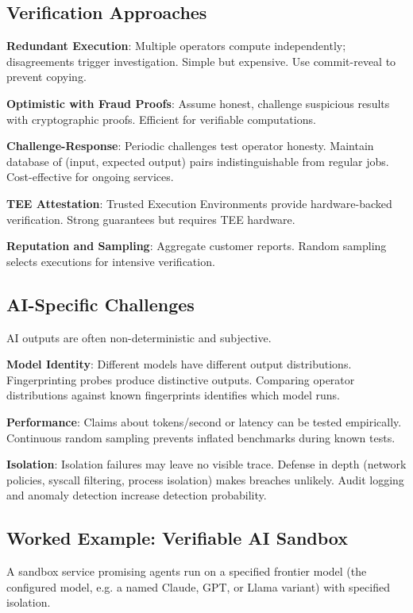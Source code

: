\documentclass[11pt,a4paper]{article}
\begin{document}
\subsection{Verification Approaches}

\textbf{Redundant Execution}: Multiple operators compute independently; disagreements trigger investigation. Simple but expensive. Use commit-reveal to prevent copying.

\textbf{Optimistic with Fraud Proofs}: Assume honest, challenge suspicious results with cryptographic proofs. Efficient for verifiable computations.

\textbf{Challenge-Response}: Periodic challenges test operator honesty. Maintain database of (input, expected output) pairs indistinguishable from regular jobs. Cost-effective for ongoing services.

\textbf{TEE Attestation}: Trusted Execution Environments provide hardware-backed verification. Strong guarantees but requires TEE hardware.

\textbf{Reputation and Sampling}: Aggregate customer reports. Random sampling selects executions for intensive verification.

\subsection{AI-Specific Challenges}

AI outputs are often non-deterministic and subjective.

\textbf{Model Identity}: Different models have different output distributions. Fingerprinting probes produce distinctive outputs. Comparing operator distributions against known fingerprints identifies which model runs.

\textbf{Performance}: Claims about tokens/second or latency can be tested empirically. Continuous random sampling prevents inflated benchmarks during known tests.

\textbf{Isolation}: Isolation failures may leave no visible trace. Defense in depth (network policies, syscall filtering, process isolation) makes breaches unlikely. Audit logging and anomaly detection increase detection probability.

\subsection{Worked Example: Verifiable AI Sandbox}

A sandbox service promising agents run on a specified frontier model (the configured model, e.g. a named Claude, GPT, or Llama variant) with specified isolation.
\end{document}
